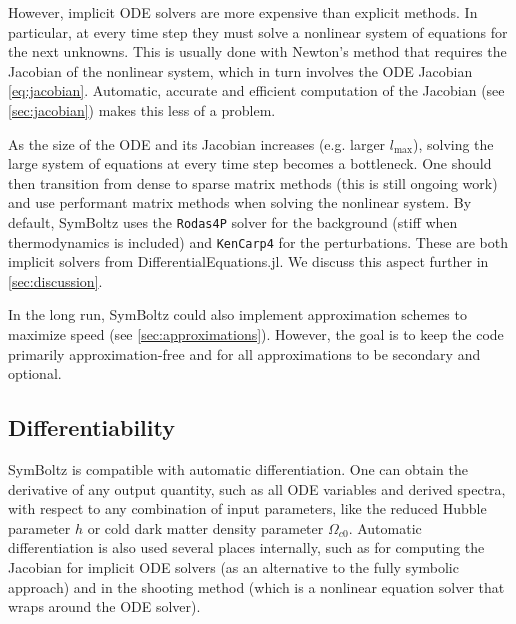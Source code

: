 \documentclass{aa}
\newcommand\lmax{l_\text{max}}
\begin{document}
However, implicit ODE solvers are more expensive than explicit methods.
In particular, at every time step they must solve a nonlinear system of equations for the next unknowns.
This is usually done with Newton's method that requires the Jacobian of the nonlinear system, which in turn involves the ODE Jacobian \eqref{eq:jacobian}.
Automatic, accurate and efficient computation of the Jacobian (see \cref{sec:jacobian}) makes this less of a problem.

As the size of the ODE and its Jacobian increases (e.g. larger $\lmax$), solving the large system of equations at every time step becomes a bottleneck.
One should then transition from dense to sparse matrix methods (this is still ongoing work) and use performant matrix methods when solving the nonlinear system.
By default, SymBoltz uses the \texttt{Rodas4P} \citep{steinebachOrderreductionROWmethodsDAEs1995} solver for the background (stiff when thermodynamics is included) and \texttt{KenCarp4} \citep{kennedyAdditiveRungeKutta2003} for the perturbations.
These are both implicit solvers from DifferentialEquations.jl.
We discuss this aspect further in \cref{sec:discussion}.

In the long run, SymBoltz could also implement approximation schemes to maximize speed (see \cref{sec:approximations}).
However, the goal is to keep the code primarily approximation-free and for all approximations to be secondary and optional.

\subsection{Differentiability}
\label{sec:diff}


SymBoltz is compatible with automatic differentiation.
One can obtain the derivative of any output quantity, such as all ODE variables and derived spectra, with respect to any combination of input parameters, like the reduced Hubble parameter $h$ or cold dark matter density parameter $\Omega_{c0}$.
Automatic differentiation is also used several places internally, such as for computing the Jacobian for implicit ODE solvers (as an alternative to the fully symbolic approach) and in the shooting method (which is a nonlinear equation solver that wraps around the ODE solver).
\end{document}
